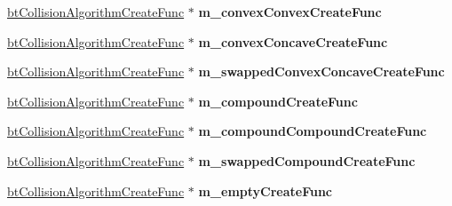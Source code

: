 \begin{DoxyCompactItemize}
\item 
\hypertarget{classbt_default_collision_configuration_af154ebe2d97d1dc1aa50dbd5c0bdfa05}{\hyperlink{structbt_collision_algorithm_create_func}{bt\+Collision\+Algorithm\+Create\+Func} $\ast$ {\bfseries m\+\_\+convex\+Convex\+Create\+Func}}\label{classbt_default_collision_configuration_af154ebe2d97d1dc1aa50dbd5c0bdfa05}

\item 
\hypertarget{classbt_default_collision_configuration_a58c75682f422cf74ee738ca0c2036dcf}{\hyperlink{structbt_collision_algorithm_create_func}{bt\+Collision\+Algorithm\+Create\+Func} $\ast$ {\bfseries m\+\_\+convex\+Concave\+Create\+Func}}\label{classbt_default_collision_configuration_a58c75682f422cf74ee738ca0c2036dcf}

\item 
\hypertarget{classbt_default_collision_configuration_adbfc5551f6000da89660be849142c37c}{\hyperlink{structbt_collision_algorithm_create_func}{bt\+Collision\+Algorithm\+Create\+Func} $\ast$ {\bfseries m\+\_\+swapped\+Convex\+Concave\+Create\+Func}}\label{classbt_default_collision_configuration_adbfc5551f6000da89660be849142c37c}

\item 
\hypertarget{classbt_default_collision_configuration_a270459758504cc6eed92373d4c8b19cb}{\hyperlink{structbt_collision_algorithm_create_func}{bt\+Collision\+Algorithm\+Create\+Func} $\ast$ {\bfseries m\+\_\+compound\+Create\+Func}}\label{classbt_default_collision_configuration_a270459758504cc6eed92373d4c8b19cb}

\item 
\hypertarget{classbt_default_collision_configuration_a72c28cbe406542cd4bb19f785e688d48}{\hyperlink{structbt_collision_algorithm_create_func}{bt\+Collision\+Algorithm\+Create\+Func} $\ast$ {\bfseries m\+\_\+compound\+Compound\+Create\+Func}}\label{classbt_default_collision_configuration_a72c28cbe406542cd4bb19f785e688d48}

\item 
\hypertarget{classbt_default_collision_configuration_aeb3a38cf966e5a3c48b3bd3c02349edc}{\hyperlink{structbt_collision_algorithm_create_func}{bt\+Collision\+Algorithm\+Create\+Func} $\ast$ {\bfseries m\+\_\+swapped\+Compound\+Create\+Func}}\label{classbt_default_collision_configuration_aeb3a38cf966e5a3c48b3bd3c02349edc}

\item 
\hypertarget{classbt_default_collision_configuration_adf24a7ffe8927eafdd2e45608254aad0}{\hyperlink{structbt_collision_algorithm_create_func}{bt\+Collision\+Algorithm\+Create\+Func} $\ast$ {\bfseries m\+\_\+empty\+Create\+Func}}\label{classbt_default_collision_configuration_adf24a7ffe8927eafdd2e45608254aad0}


\end{DoxyCompactItemize}
